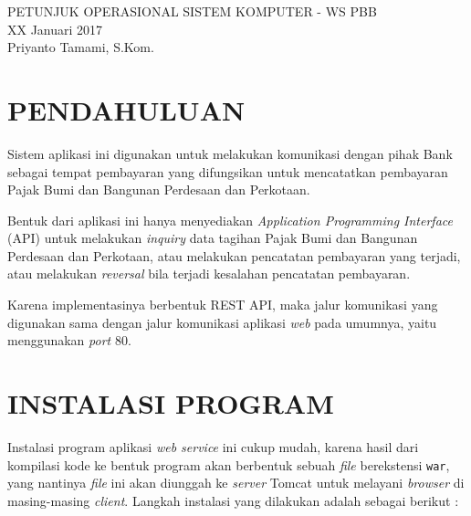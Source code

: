 \documentclass[pdftex,12pt, oneside]{article}
\begin{document}
\sloppy %

\begin{center}
{\large PETUNJUK OPERASIONAL SISTEM KOMPUTER - WS PBB}
\\[1cm]
XX Januari 2017\\
Priyanto Tamami, S.Kom.
\end{center}




\section{PENDAHULUAN}

Sistem aplikasi ini digunakan untuk melakukan komunikasi dengan pihak Bank sebagai tempat pembayaran yang difungsikan untuk mencatatkan pembayaran Pajak Bumi dan Bangunan Perdesaan dan Perkotaan. 

Bentuk dari aplikasi ini hanya menyediakan \textit{Application Programming Interface} (API) untuk melakukan \textit{inquiry} data tagihan Pajak Bumi dan Bangunan Perdesaan dan Perkotaan, atau melakukan pencatatan pembayaran yang terjadi, atau melakukan \textit{reversal} bila terjadi kesalahan pencatatan pembayaran.

Karena implementasinya berbentuk REST API, maka jalur komunikasi yang digunakan sama dengan jalur komunikasi aplikasi \textit{web} pada umumnya, yaitu menggunakan \textit{port} 80.

\section{INSTALASI PROGRAM}

Instalasi program aplikasi \textit{web service} ini cukup mudah, karena hasil dari kompilasi kode ke bentuk program akan berbentuk sebuah \textit{file} berekstensi \texttt{war}, yang nantinya \textit{file} ini akan diunggah ke \textit{server} Tomcat untuk melayani \textit{browser} di masing-masing \textit{client}. Langkah instalasi yang dilakukan adalah sebagai berikut :
\end{document}
